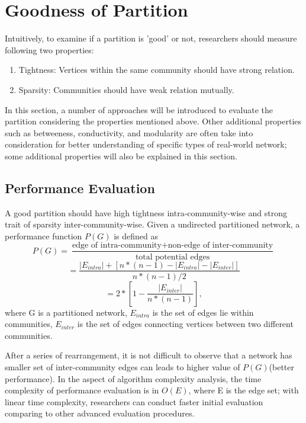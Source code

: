 \documentclass[12pt]{article}
\begin{document}
\section{Goodness of Partition}

Intuitively, to examine if a partition is 'good' or not, researchers should measure following two properties: 
\begin{enumerate}[label=(\alph*)]
\item Tightness: Vertices within the same community should have strong relation.
\item Sparsity: Communities should have weak relation mutually.
\end{enumerate}

In this section, a number of approaches will be introduced to evaluate the partition considering the properties mentioned above. Other additional properties such as betweeness, conductivity, and modularity are often take into consideration for better understanding of specific types of real-world network\cite{7,8}; some additional properties will also be explained in this section.

\subsection{Performance Evaluation}
A good partition should have high tightness intra-community-wise and strong trait of sparsity inter-community-wise. Given a undirected partitioned network, a performance function $P(G)$ is defined as
$$P(G) = \frac{\text{edge of intra-community} + \text{non-edge of inter-community}}{\text{total potential edges}}$$
$$=\frac{|E_{intra}| + [n*(n-1) - |E_{intra}| - |E_{inter}|]}{n*(n-1)/2}$$
$$=2*\left[ 1 - \frac{ |E_{inter}| } { n*\left( n-1 \right) }  \right],$$
where G is a partitioned network, $E_{intra}$ is the set of edges lie within communities, $E_{inter}$ is the set of edges connecting vertices between two different communities. 

\bigbreak

After a series of rearrangement, it is not difficult to observe that a network has smaller set of inter-community edges can leads to higher value of $P(G)$(better performance)\cite{7}. In the aspect of algorithm complexity analysis, the time complexity of performance evaluation is in $O(E)$, where E is the edge set; with linear time complexity, researchers can conduct faster initial evaluation comparing to other advanced evaluation procedures.
\end{document}
